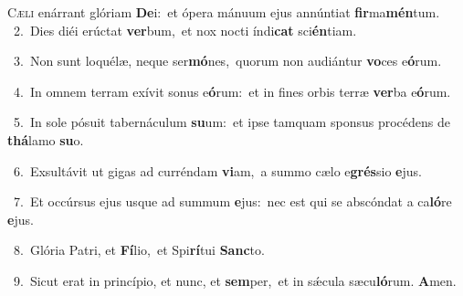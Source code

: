 \lettrine{\initial\textcolor{\initialcolor}{C}}{æli} enárrant glóriam \textbf{De}\-i:~\star et ópera mánuum ejus annúntiat \textbf{fir}\-ma\-\textbf{mén}\-tum.\\
{\numbfont\textcolor{\numbcolor}{~2.}}~Dies diéi erúctat \textbf{ver}\-bum,~\star et nox nocti índi\textbf{cat} sci\-\textbf{én}\-tiam.\par
{\numbfont\textcolor{\numbcolor}{~3.}}~Non sunt loquélæ, neque ser\-\textbf{mó}\-nes,~\star quorum non audiántur \textbf{vo}\-ces e\-\textbf{ó}\-rum.\par
{\numbfont\textcolor{\numbcolor}{~4.}}~In omnem terram exívit sonus e\-\textbf{ó}\-rum:~\star et in fines orbis terræ \textbf{ver}\-ba e\-\textbf{ó}\-rum.\par
{\numbfont\textcolor{\numbcolor}{~5.}}~In sole pósuit tabernáculum \textbf{su}\-um:~\star et ipse tamquam sponsus procédens de \textbf{thá}\-lamo \textbf{su}\-o.\par
{\numbfont\textcolor{\numbcolor}{~6.}}~Exsultávit ut gigas ad curréndam \textbf{vi}\-am,~\star a summo cælo e\-\textbf{grés}\-sio \textbf{e}\-jus.\par
{\numbfont\textcolor{\numbcolor}{~7.}}~Et occúrsus ejus usque ad summum \textbf{e}\-jus:~\star nec est qui se abscóndat a ca\-\textbf{ló}\-re \textbf{e}\-jus.\par
{\numbfont\textcolor{\numbcolor}{~8.}}~Glória Patri, et \textbf{Fí}\-lio,~\star et Spi\-\textbf{rí}\-tui \textbf{Sanc}\-to.\par
{\numbfont\textcolor{\numbcolor}{~9.}}~Sicut erat in princípio, et nunc, et \textbf{sem}\-per,~\star et in sǽcula sæcu\-\textbf{ló}\-rum. \textbf{A}\-men.\par
